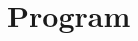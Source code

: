 \documentclass{amsart}
\theoremstyle{definition}
\theoremstyle{remark}
\begin{document}
\section*{Program}













\end{document}
